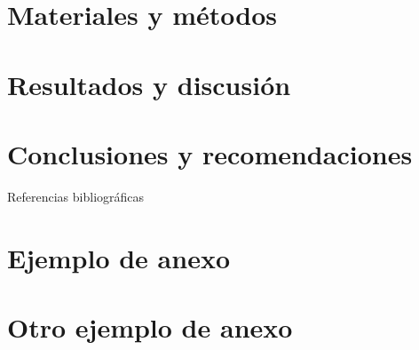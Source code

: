 \documentclass[a4paper, 12pt, oneside]{book}
\begin{document}
\begin{onehalfspace}
  \chapter{Materiales y métodos}

  \chapter{Resultados y discusión}

  \chapter{Conclusiones y recomendaciones}

  \resetBeforeTitleSpace
  \begin{myreferences}{Referencias bibliográficas}
    
  \end{myreferences}

  \begin{anexos}
    \chapter{Ejemplo de anexo}

    \chapter{Otro ejemplo de anexo}

  \end{anexos}
\end{onehalfspace}
\end{document}
